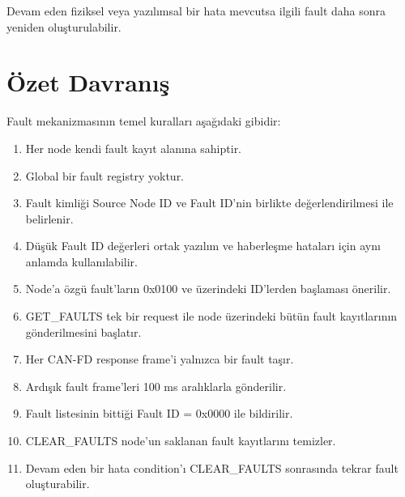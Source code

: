 \documentclass[a4paper,11pt]{article}
\begin{document}
Devam eden fiziksel veya yazılımsal bir hata mevcutsa ilgili
fault daha sonra yeniden oluşturulabilir.

\section{Özet Davranış}

Fault mekanizmasının temel kuralları aşağıdaki gibidir:

\begin{enumerate}
    \item Her node kendi fault kayıt alanına sahiptir.
    
    \item Global bir fault registry yoktur.
    
    \item Fault kimliği Source Node ID ve Fault ID'nin birlikte
    değerlendirilmesi ile belirlenir.
    
    \item Düşük Fault ID değerleri ortak yazılım ve haberleşme
    hataları için aynı anlamda kullanılabilir.
    
    \item Node'a özgü fault'ların 0x0100 ve üzerindeki ID'lerden
    başlaması önerilir.
    
    \item GET\_FAULTS tek bir request ile node üzerindeki bütün
    fault kayıtlarının gönderilmesini başlatır.
    
    \item Her CAN-FD response frame'i yalnızca bir fault taşır.
    
    \item Ardışık fault frame'leri 100 ms aralıklarla gönderilir.
    
    \item Fault listesinin bittiği Fault ID = 0x0000 ile bildirilir.
    
    \item CLEAR\_FAULTS node'un saklanan fault kayıtlarını temizler.
    
    \item Devam eden bir hata condition'ı CLEAR\_FAULTS sonrasında
    tekrar fault oluşturabilir.
\end{enumerate}
\end{document}
